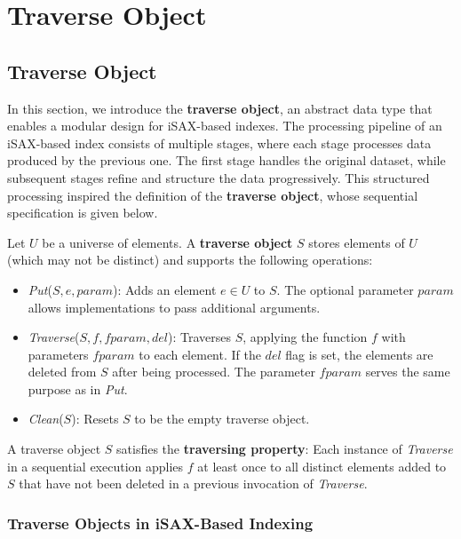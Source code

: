 \chapter{Traverse Object}
\label{chapter:traverse-object}

\section{Traverse Object}

In this section, we introduce the \textbf{traverse object}, an abstract data type
that enables a modular design for iSAX-based indexes. The processing pipeline of
an iSAX-based index consists of multiple stages, where each stage processes data
produced by the previous one. The first stage handles the original dataset, while
subsequent stages refine and structure the data progressively. This structured
processing inspired the definition of the \textbf{traverse object}, whose
sequential specification is given below.
% 
\begin{definition}
\label{def:traverse}
Let $U$ be a universe of elements. A \textbf{traverse object} $S$ stores elements
of $U$ (which may not be distinct) and supports the following operations:

\begin{itemize}
    \item \textit{Put}($S,e,\mathit{param}$): Adds an element $e \in U$ to $S$.
    The optional parameter $\mathit{param}$ allows implementations to pass
    additional arguments.
    
    \item \textit{Traverse}($S,f,\mathit{fparam},del$): Traverses $S$, applying
    the function $f$ with parameters $\mathit{fparam}$ to each element. If the
    $del$ flag is set, the elements are deleted from $S$ after being processed.
    The parameter $\mathit{fparam}$ serves the same purpose as in \textit{Put}.

    \item \textit{Clean}($S$): Resets $S$ to be the empty traverse
    object.
\end{itemize}
% 
A traverse object $S$ satisfies the \textbf{traversing property}:  
Each instance of \textit{Traverse} in a sequential execution applies $f$ at
least once to all distinct elements added to $S$ that have not been deleted
in a previous invocation of \textit{Traverse}.
\end{definition}

\subsection{Traverse Objects in iSAX-Based Indexing}

